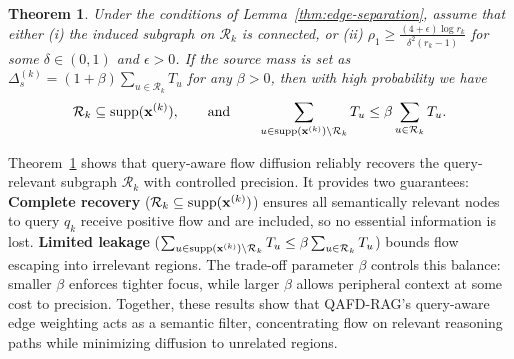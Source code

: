\documentclass{article} %
\newtheorem{theorem}{Theorem}
\begin{document}
\begin{theorem}%
\label{thm:recovery}
Under the conditions of Lemma~\ref{thm:edge-separation}, assume that either \textit{(i)} the induced subgraph on $\mathcal{R}_k$ is connected, or \textit{(ii)} $\rho_1 \geq \frac{(4+\epsilon)\log r_k}{\delta^2(r_k-1)}$ for some $\delta \in (0,1)$ and $\epsilon > 0$. If the source mass is set as $\Delta_s^{(k)} = (1+\beta)\sum_{u \in \mathcal{R}_k} T_u$ for any $\beta > 0$, then with high probability we have
\begin{equation}
\begin{aligned}
 \mathcal{R}_k \subseteq \textnormal{supp}(\mathbf{x}^{(k)}), \qquad\textnormal{and}\qquad   \sum_{u \in \textnormal{supp}(\mathbf{x}^{(k)}) \setminus \mathcal{R}_k} T_u 
   \leq \beta \sum_{u \in \mathcal{R}_k} T_u.
\end{aligned}
\end{equation}
\end{theorem}


Theorem~\ref{thm:recovery} shows that query-aware flow diffusion reliably recovers the query-relevant subgraph $\mathcal{R}_k$ with controlled precision. It provides two guarantees: \textbf{Complete recovery} ($\mathcal{R}_k \subseteq \textnormal{supp}(\mathbf{x}^{(k)})$) ensures all semantically relevant nodes to query $q_k$ receive positive flow and are included, so no essential information is lost. \textbf{Limited leakage} ($\sum_{u \in \textnormal{supp}(\mathbf{x}^{(k)}) \setminus \mathcal{R}_k} T_u \leq \beta \sum_{u \in \mathcal{R}_k} T_u$) bounds flow escaping into irrelevant regions. The trade-off parameter $\beta$ controls this balance: smaller $\beta$ enforces tighter focus, while larger $\beta$ allows peripheral context at some cost to precision. Together, these results show that QAFD-RAG’s query-aware edge weighting acts as a semantic filter, concentrating flow on relevant reasoning paths while minimizing diffusion to unrelated regions. 
\end{document}
